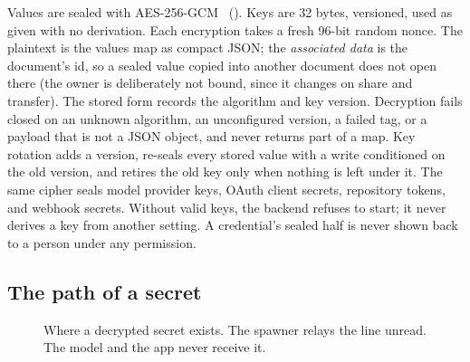 Values are sealed with AES-256-GCM~\cite{nist80038d}
(). Keys are 32 bytes, versioned, used
as given with no derivation. Each encryption takes a fresh 96-bit
random nonce. The plaintext is the values map as compact JSON; the
\emph{associated data} is the document's id, so a sealed value copied
into another document does not open there (the owner is deliberately
not bound, since it changes on share and transfer). The stored form
records the algorithm and key version. Decryption fails closed on an
unknown algorithm, an unconfigured version, a failed tag, or a payload
that is not a JSON object, and never returns part of a map. Key
rotation adds a version, re-seals every stored value with a write
conditioned on the old version, and retires the old key only when
nothing is left under it. The same cipher seals model provider keys,
OAuth client secrets, repository tokens, and webhook secrets. Without
valid keys, the backend refuses to start; it never derives a key from
another setting. A credential's sealed half is never shown back to a
person under any permission.

\subsection{The path of a secret}

\begin{figure}[t]
\centering
{}
\caption{Where a decrypted secret exists. The spawner relays the line
unread. The model and the app never receive it.}
\label{fig:secret}
\end{figure}

